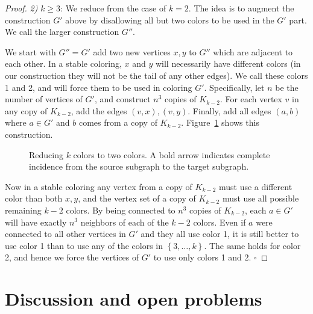 \documentclass{llncs}
\begin{document}
\begin{proof}
\noindent \emph{2)} $k\ge3$:
We reduce from the case of $k=2$. The idea is to augment the construction $G'$
above by disallowing all but two colors to be used in the $G'$ part. We call the
larger construction $G''$. 

We start with $G'' = G'$ add two new vertices $x,y$ to $G''$ which are adjacent
to each other. In a stable coloring, $x$ and $y$ will necessarily have different
colors (in our construction they will not be the tail of any other edges). We
call these colors 1 and 2, and will force them to be used in coloring $G'$.
Specifically, let $n$ be the number of vertices of $G'$, and construct $n^3$
copies of $K_{k-2}$. For each vertex $v$ in any copy of $K_{k-2}$, add the edges
$(v,x), (v,y)$. Finally, add all edges $(a,b)$ where $a \in G'$ and $b$ comes
from a copy of $K_{k-2}$. Figure~\ref{weakkcolornphard} shows this construction. 

\begin{figure}[htb]
\centering
{}
\caption{Reducing $k$ colors to two colors. A bold arrow indicates complete
incidence from the source subgraph to the target subgraph.}
\label{weakkcolornphard}
\end{figure}

Now in a stable coloring any vertex from a copy of $K_{k-2}$ must use a
different color than both $x,y$, and the vertex set of a copy of $K_{k-2}$ must
use all possible remaining $k-2$ colors. By being connected to $n^3$ copies of
$K_{k-2}$, each $a \in G'$ will have exactly $n^3$ neighbors of each of the
$k-2$ colors. Even if $a$ were connected to all other vertices in $G'$ and they
all use color 1, it is still better to use color 1 than to use any of the colors
in $\left \{ 3, \dots, k \right \}$. The same holds for color 2, and hence we
force the vertices of $G'$ to use only colors 1 and 2.  \hfill $\square$
\end{proof}

\section{Discussion and open problems}
\end{document}
